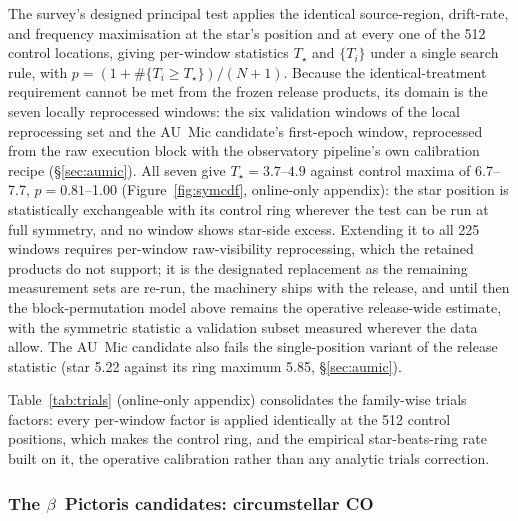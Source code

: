 \documentclass{openjournal}
\begin{document}
The survey's designed principal test applies the identical
source-region, drift-rate, and frequency maximisation at the star's
position and at every one of the 512 control locations, giving
per-window statistics $T_\star$ and $\{T_i\}$ under a single search
rule, with $p = (1+\#\{T_i\geq T_\star\})/(N+1)$. Because the
identical-treatment requirement cannot be met from the frozen release
products, its domain is the seven locally reprocessed windows: the
six validation windows of the local reprocessing set and the AU~Mic
candidate's first-epoch window, reprocessed from the raw execution
block with the observatory pipeline's own calibration recipe
(\S\ref{sec:aumic}). All seven give $T_\star=3.7$--$4.9$ against
control maxima of 6.7--7.7, $p=0.81$--1.00 (Figure~\ref{fig:symcdf},
online-only appendix): the star position is statistically
exchangeable with its control ring wherever the test can be run at
full symmetry, and no window shows star-side excess. Extending it to
all 225 windows requires per-window raw-visibility reprocessing,
which the retained products do not support; it is the designated
replacement as the remaining measurement sets are re-run, the
machinery ships with the release, and until then the
block-permutation model above remains the operative release-wide
estimate, with the symmetric statistic a validation subset measured
wherever the data allow. The AU~Mic candidate also fails the
single-position variant of the release statistic (star 5.22 against
its ring maximum 5.85, \S\ref{sec:aumic}).

Table~\ref{tab:trials} (online-only appendix) consolidates the
family-wise trials factors: every per-window factor is applied
identically at the 512 control positions, which makes the control
ring, and the empirical star-beats-ring rate built on it, the
operative calibration rather than any analytic trials correction.

\subsubsection*{The $\beta$~Pictoris candidates: circumstellar CO}
\end{document}
